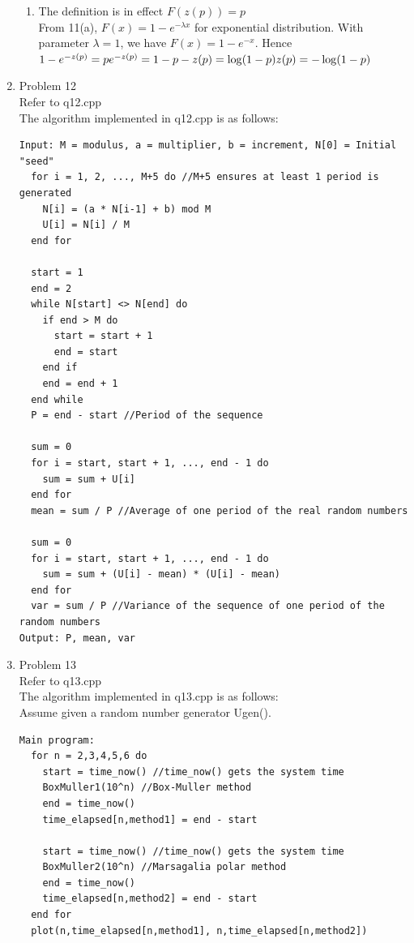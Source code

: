 \documentclass[a4paper]{article}
\begin{document}
\begin{enumerate}
\begin{enumerate}
\item
The definition is in effect $F(z(p))=p$\\
From 11(a), $F(x)=1-e^{-\lambda x}$ for exponential distribution.
With parameter $\lambda=1$, we have $F(x)=1-e^{-x}$. Hence\\
$1-e^{-z(p)}=p\\
e^{-z(p)}=1-p\\
-z(p)=\log(1-p)\\
z(p)=-\log(1-p)$
\end{enumerate}

\pagebreak

\item Problem 12\\
Refer to q12.cpp\\
The algorithm implemented in q12.cpp is as follows:
\begin{verbatim}
Input: M = modulus, a = multiplier, b = increment, N[0] = Initial "seed"
  for i = 1, 2, ..., M+5 do //M+5 ensures at least 1 period is generated
    N[i] = (a * N[i-1] + b) mod M
    U[i] = N[i] / M
  end for

  start = 1
  end = 2
  while N[start] <> N[end] do
    if end > M do
      start = start + 1
      end = start
    end if
    end = end + 1
  end while
  P = end - start //Period of the sequence
  
  sum = 0
  for i = start, start + 1, ..., end - 1 do
    sum = sum + U[i]
  end for
  mean = sum / P //Average of one period of the real random numbers

  sum = 0
  for i = start, start + 1, ..., end - 1 do
    sum = sum + (U[i] - mean) * (U[i] - mean)
  end for
  var = sum / P //Variance of the sequence of one period of the random numbers
Output: P, mean, var
\end{verbatim}

\pagebreak

\item Problem 13\\
Refer to q13.cpp\\
The algorithm implemented in q13.cpp is as follows:\\
Assume given a random number generator Ugen().
\begin{verbatim}
Main program:
  for n = 2,3,4,5,6 do
    start = time_now() //time_now() gets the system time
    BoxMuller1(10^n) //Box-Muller method
    end = time_now()
    time_elapsed[n,method1] = end - start
    
    start = time_now() //time_now() gets the system time
    BoxMuller2(10^n) //Marsagalia polar method
    end = time_now()
    time_elapsed[n,method2] = end - start
  end for
  plot(n,time_elapsed[n,method1], n,time_elapsed[n,method2])


\end{verbatim}
\end{enumerate}
\end{document}

